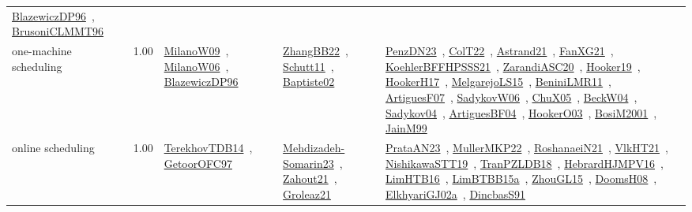 {\begin{longtable}{p{3cm}r>{\raggedright\arraybackslash}p{6cm}>{\raggedright\arraybackslash}p{6cm}>{\raggedright\arraybackslash}p{8cm}}
\href{../works/BlazewiczDP96.pdf}{BlazewiczDP96}~\cite{BlazewiczDP96}, \href{../works/BrusoniCLMMT96.pdf}{BrusoniCLMMT96}~\cite{BrusoniCLMMT96}\\
\index{one-machine scheduling}\index{Concepts!one-machine scheduling}one-machine scheduling &  1.00 & \href{../works/MilanoW09.pdf}{MilanoW09}~\cite{MilanoW09}, \href{../works/MilanoW06.pdf}{MilanoW06}~\cite{MilanoW06}, \href{../works/BlazewiczDP96.pdf}{BlazewiczDP96}~\cite{BlazewiczDP96} & \href{../works/ZhangBB22.pdf}{ZhangBB22}~\cite{ZhangBB22}, \href{../works/Schutt11.pdf}{Schutt11}~\cite{Schutt11}, \href{../works/Baptiste02.pdf}{Baptiste02}~\cite{Baptiste02} & \href{../works/PenzDN23.pdf}{PenzDN23}~\cite{PenzDN23}, \href{../works/ColT22.pdf}{ColT22}~\cite{ColT22}, \href{../works/Astrand21.pdf}{Astrand21}~\cite{Astrand21}, \href{../works/FanXG21.pdf}{FanXG21}~\cite{FanXG21}, \href{../works/KoehlerBFFHPSSS21.pdf}{KoehlerBFFHPSSS21}~\cite{KoehlerBFFHPSSS21}, \href{../works/ZarandiASC20.pdf}{ZarandiASC20}~\cite{ZarandiASC20}, \href{../works/Hooker19.pdf}{Hooker19}~\cite{Hooker19}, \href{../works/HookerH17.pdf}{HookerH17}~\cite{HookerH17}, \href{../works/MelgarejoLS15.pdf}{MelgarejoLS15}~\cite{MelgarejoLS15}, \href{../works/BeniniLMR11.pdf}{BeniniLMR11}~\cite{BeniniLMR11}, \href{../works/ArtiguesF07.pdf}{ArtiguesF07}~\cite{ArtiguesF07}, \href{../works/SadykovW06.pdf}{SadykovW06}~\cite{SadykovW06}, \href{../works/ChuX05.pdf}{ChuX05}~\cite{ChuX05}, \href{../works/BeckW04.pdf}{BeckW04}~\cite{BeckW04}, \href{../works/Sadykov04.pdf}{Sadykov04}~\cite{Sadykov04}, \href{../works/ArtiguesBF04.pdf}{ArtiguesBF04}~\cite{ArtiguesBF04}, \href{../works/HookerO03.pdf}{HookerO03}~\cite{HookerO03}, \href{../works/BosiM2001.pdf}{BosiM2001}~\cite{BosiM2001}, \href{../works/JainM99.pdf}{JainM99}~\cite{JainM99}\\
\index{online scheduling}\index{Concepts!online scheduling}online scheduling &  1.00 & \href{../works/TerekhovTDB14.pdf}{TerekhovTDB14}~\cite{TerekhovTDB14}, \href{../works/GetoorOFC97.pdf}{GetoorOFC97}~\cite{GetoorOFC97} & \href{../works/Mehdizadeh-Somarin23.pdf}{Mehdizadeh-Somarin23}~\cite{Mehdizadeh-Somarin23}, \href{../works/Zahout21.pdf}{Zahout21}~\cite{Zahout21}, \href{../works/Groleaz21.pdf}{Groleaz21}~\cite{Groleaz21} & \href{../works/PrataAN23.pdf}{PrataAN23}~\cite{PrataAN23}, \href{../works/MullerMKP22.pdf}{MullerMKP22}~\cite{MullerMKP22}, \href{../works/RoshanaeiN21.pdf}{RoshanaeiN21}~\cite{RoshanaeiN21}, \href{../works/VlkHT21.pdf}{VlkHT21}~\cite{VlkHT21}, \href{../works/NishikawaSTT19.pdf}{NishikawaSTT19}~\cite{NishikawaSTT19}, \href{../works/TranPZLDB18.pdf}{TranPZLDB18}~\cite{TranPZLDB18}, \href{../works/HebrardHJMPV16.pdf}{HebrardHJMPV16}~\cite{HebrardHJMPV16}, \href{../works/LimHTB16.pdf}{LimHTB16}~\cite{LimHTB16}, \href{../works/LimBTBB15a.pdf}{LimBTBB15a}~\cite{LimBTBB15a}, \href{../works/ZhouGL15.pdf}{ZhouGL15}~\cite{ZhouGL15}, \href{../works/DoomsH08.pdf}{DoomsH08}~\cite{DoomsH08}, \href{../works/ElkhyariGJ02a.pdf}{ElkhyariGJ02a}~\cite{ElkhyariGJ02a}, \href{../works/DincbasS91.pdf}{DincbasS91}~\cite{DincbasS91}\\

\end{longtable}}
